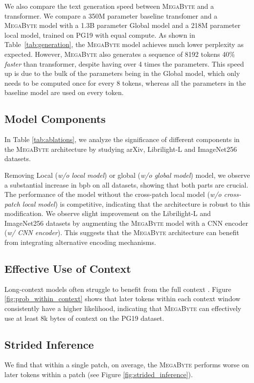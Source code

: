 We also compare the text generation speed between \textsc{MegaByte} and a transformer. We compare a 350M parameter baseline transfomer and a \textsc{MegaByte} model with a 1.3B parameter Global model and a 218M parameter local model, trained on PG19 with equal compute. As shown in Table~\ref{tab:generation}, the \textsc{MegaByte} model achieves much lower perplexity as expected. However, \textsc{MegaByte} also generates a sequence of 8192 tokens 40\% \emph{faster} than transformer, despite having over 4 times the parameters. This speed up is due to the bulk of the parameters being in the Global model, which only needs to be computed once for every 8 tokens, whereas all the parameters in the baseline model are used on every token.

\subsection{Model Components} In Table \ref{tab:ablations}, we  analyze the significance of different components in the \textsc{MegaByte} architecture by studying arXiv, Librilight-L and ImageNet256 datasets. 

Removing Local (\textit{w/o local model}) or global (\textit{w/o global model}) model, we observe a substantial increase in bpb on all datasets, showing that both parts are crucial. The performance of the model without the cross-patch local model (\textit{w/o cross-patch local model}) is competitive, indicating that the architecture is robust to this modification. We observe slight improvement on the Librilight-L and ImageNet256 datasets by augmenting the \textsc{MegaByte} model with a CNN encoder (\textit{w/ CNN encoder}). This suggests that the \textsc{MegaByte} architecture can benefit from integrating alternative encoding mechanisms.

\subsection{Effective Use of Context} Long-context models often struggle to benefit from the full context \citep{sun2021long}. Figure \ref{fig:prob_within_context} shows that later tokens within each context window consistently have a higher likelihood, indicating that \textsc{MegaByte} can effectively use at least 8k bytes of context on the PG19 dataset. 

\subsection{Strided Inference}
\label{strided_inference}
 We find that within a single patch, on average, the \textsc{MegaByte} performs worse on later tokens within a patch (see Figure \ref{fig:strided_inference}). 


